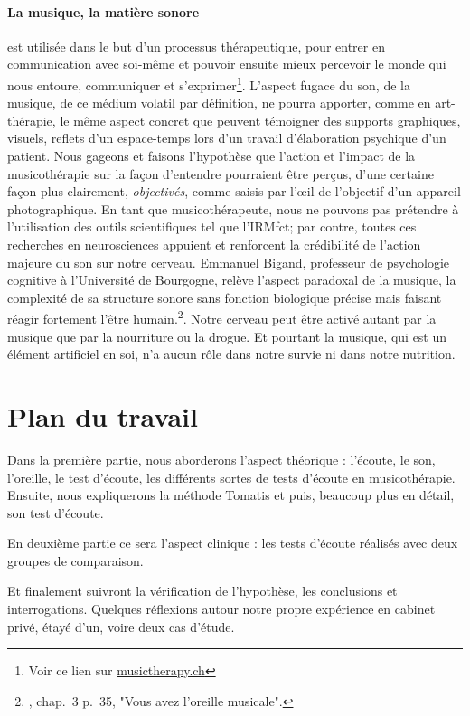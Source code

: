\paragraph{La musique, la matière sonore}est utilisée dans le but d'un processus
thérapeutique, pour entrer en communication avec soi-même et pouvoir ensuite mieux percevoir le monde qui nous
entoure, communiquer et s'exprimer\footnote{%
Voir ce lien sur \href{http://www.musictherapy.ch/fr/musicotherapie/quest-ce-que-la-musicotherapie/}{musictherapy.ch}}.
L'aspect fugace du son, de la musique, de ce médium volatil par
définition, ne pourra apporter, comme en art-thérapie, le
même aspect concret que peuvent témoigner des supports graphiques,
visuels, reflets d'un espace-temps lors d'un travail d'élaboration
psychique d'un patient. Nous gageons et faisons l'hypothèse que l'action et l'impact de la
musicothérapie sur la façon d'entendre pourraient être perçus, d'une certaine façon plus
clairement, \textsl{ objectivés}, comme saisis par l'\oe il de l'objectif d'un appareil
photographique.
En tant que musicothérapeute, nous ne pouvons pas prétendre à l'utilisation des outils
scientifiques tel que l'IRMfct; par contre, toutes ces recherches en
neurosciences appuient et renforcent la crédibilité de l'action
majeure du son sur notre cerveau.  Emmanuel Bigand, professeur de
psychologie cognitive à l'Université de Bourgogne, relève l'aspect
paradoxal de la musique, la complexité de sa structure sonore sans
fonction biologique précise mais faisant réagir fortement l'être
humain.\footnote{\cite{AuteurInconnu2011}, chap.~3 p.~35, "Vous avez l'oreille musicale".}.  Notre cerveau peut être activé autant par
la musique que par la nourriture ou la drogue. Et pourtant la musique,
qui est un élément artificiel en soi, n'a aucun rôle dans notre survie ni dans
notre nutrition.


\section{Plan du travail}

Dans la première partie, nous aborderons l'aspect théorique : l'écoute, le son, l'oreille, le test d'écoute, les différents sortes de tests d'écoute en musicothérapie.  Ensuite, nous expliquerons  la méthode Tomatis
et puis, beaucoup plus en détail, son test d'écoute.

En deuxième partie ce sera l'aspect clinique : les tests d'écoute réalisés  avec deux groupes de
comparaison.

Et finalement suivront la vérification de l'hypothèse, les conclusions et interrogations. 
Quelques réflexions autour notre propre expérience en cabinet privé, étayé d'un, voire deux cas d'étude.
